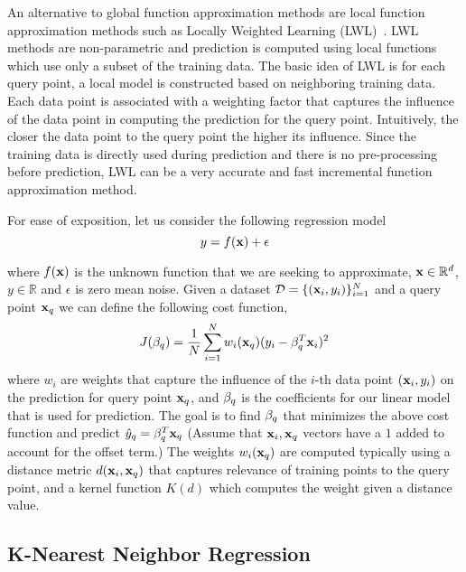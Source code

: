 An alternative to global function approximation methods are local
function approximation methods such as Locally Weighted Learning
(LWL)~\cite{DBLP:journals/air/AtkesonMS97a,
  DBLP:journals/air/AtkesonMS97}. LWL methods are 
non-parametric and prediction is computed using local functions which
use only a subset of the training data. The basic idea of LWL is for
each query point, a local model is constructed based on
neighboring training data. Each data point is associated with a
weighting factor that captures the influence of the data point in
computing the prediction for the query point. Intuitively, the closer
the data point to the query point the higher its influence. Since the
training data is directly used during prediction and there is no
pre-processing before prediction, LWL can be a very accurate and fast
incremental function approximation method.

For ease of exposition, let us consider the following regression
model
\begin{equation}
  \label{eq:12}
  y = f(\mathbf{x}) + \epsilon
\end{equation}

where $f(\mathbf{x})$ is the unknown function that we are seeking to
approximate, $\mathbf{x} \in \mathbb{R}^d$, $y \in \mathbb{R}$ and
$\epsilon$ is zero mean noise. Given a dataset
$\mathcal{D} = \{(\mathbf{x}_i, y_i)\}_{i=1}^N$ and a query point $\mathbf{x}_q$ we can define
the following cost function,
\begin{equation}
  \label{eq:13}
  J(\beta_q) = \frac{1}{N}\sum_{i=1}^N w_i(\mathbf{x}_q)(y_i - \mathbf{\beta}_q^T\mathbf{x}_i)^2
\end{equation}
where $w_i$ are weights that capture the influence of the $i$-th data
point $(\mathbf{x}_i, y_i)$ on the prediction for query point $\mathbf{x}_q$, and
$\mathbf{\beta}_q$ is the coefficients for our linear model that is used for
prediction. The goal is to find $\mathbf{\beta}_q$ that minimizes the above
cost function and predict $\hat{y}_q = \mathbf{\beta}_q^T\mathbf{x}_q$ (Assume
that $\mathbf{x}_i, \mathbf{x}_q$ vectors have a $1$ added to account for the
offset term.) The weights $w_i(\mathbf{x}_q)$ are computed typically using
a distance metric $d(\mathbf{x}_i, \mathbf{x}_q)$ that captures relevance of
training points to the query point, and a kernel function $K(d)$ which
computes the weight given a distance value.

\subsection{K-Nearest Neighbor Regression}
\label{sec:k-nearest-neighbor}

